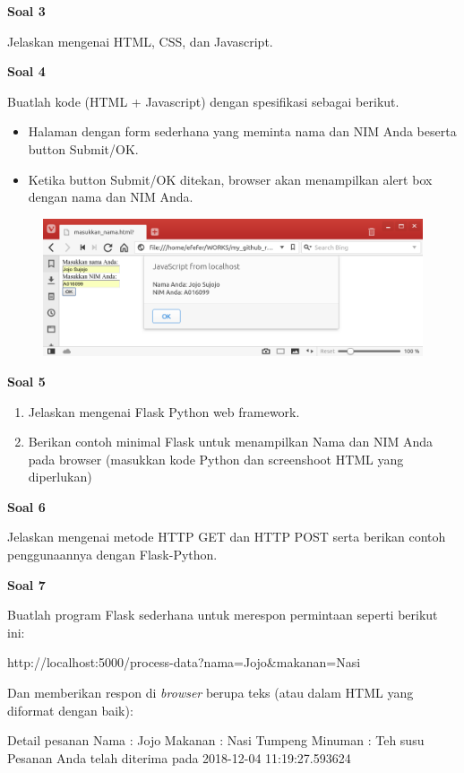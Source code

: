 \documentclass[a4paper,10pt]{extarticle}
\begin{document}
\textbf{Soal 3}

Jelaskan mengenai HTML, CSS, dan Javascript.

\textbf{Soal 4}

Buatlah kode (HTML + Javascript) dengan spesifikasi sebagai berikut.
\begin{itemize}
\item Halaman dengan form sederhana yang meminta nama dan NIM Anda beserta
button Submit/OK.
\item Ketika button Submit/OK ditekan, browser akan menampilkan alert box
dengan nama dan NIM Anda.
\end{itemize}

\begin{figure}[!h]
{\centering
\includegraphics[scale=0.4]{images/JojoSujojo.png}
\par}
\end{figure}

\textbf{Soal 5}

\begin{enumerate}
\item Jelaskan mengenai Flask Python web framework.
\item Berikan contoh minimal Flask untuk menampilkan Nama dan NIM Anda
pada browser (masukkan kode Python dan screenshoot HTML yang diperlukan)
\end{enumerate}

\textbf{Soal 6}

Jelaskan mengenai metode HTTP GET dan HTTP POST serta berikan contoh
penggunaannya dengan Flask-Python.


\textbf{Soal 7}

Buatlah program Flask sederhana untuk merespon permintaan seperti berikut ini:
\begin{textcode}
http://localhost:5000/process-data?nama=Jojo&makanan=Nasi%
\end{textcode}
Dan memberikan respon di \textit{browser}
berupa teks (atau dalam HTML yang diformat dengan baik):
\begin{textcode}
Detail pesanan
Nama : Jojo
Makanan : Nasi Tumpeng
Minuman : Teh susu
Pesanan Anda telah diterima pada 2018-12-04 11:19:27.593624 
\end{textcode}
\end{document}
